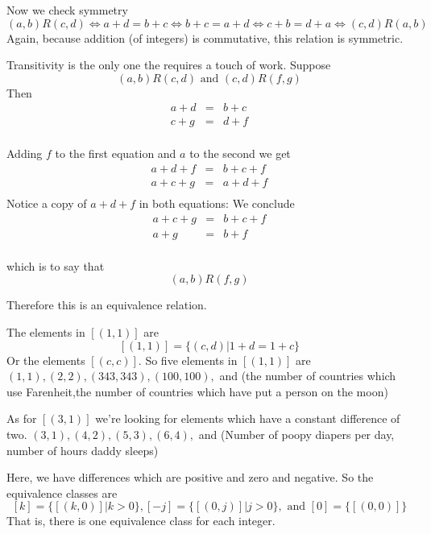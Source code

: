 \documentclass[16 pt]{amsart}
\theoremstyle{definition}
\theoremstyle{remark}
\numberwithin{equation}{subsection}
\begin{document}
Now we check symmetry
\[
(a,b)R(c,d) \iff a+d=b+c \iff b+c = a+d \iff c+b = d+a \iff (c,d)R(a,b)
\]
Again, because addition (of integers) is commutative, this relation is symmetric.

Transitivity is the only one the requires a touch of work.  Suppose
\[
(a,b)R(c,d) \text{ and } (c,d) R (f,g)
\]
Then
\begin{eqnarray*}
a+d & = & b+c \\
c+g & = & d+ f\\
\end{eqnarray*}

Adding $f$ to the first equation and $a$ to the second we get
\begin{eqnarray*}
a+d+f & = & b+c+f \\
a+c+g & = & a+d+ f\\
\end{eqnarray*}
Notice a copy of $a+d+f$ in both equations: We conclude
\begin{eqnarray*}
a+c+g & = & b+c + f \\
a+g & = & b + f\\
\end{eqnarray*}

which is to say that 
\[
(a,b)R(f,g)
\]

Therefore this is an equivalence relation.

\vspace{.5in}

The elements in $[(1,1)]$ are 
\[
[(1,1)] = \{ (c,d) | 1+d = 1+c\}
\]
Or the elements $[(c,c)]$.
So five elements in $[(1,1)]$ are $(1,1),(2,2),(343,343),(100,100),$ and
(the number of countries which use Farenheit,the number of countries which have put a person on the moon)

\vspace{.5in}
As for $[(3,1)]$ we're looking for elements which have a constant difference of two.
$(3,1),(4,2),(5,3),(6,4),$ and
(Number of poopy diapers per day, number of hours daddy sleeps)

\vspace{.5in}

Here, we have differences which are positive and zero and negative.  So the equivalence classes are
\[
[k] = \{[(k,0)] | k > 0\}, [-j] = \{[(0,j)] | j>0\}, \text{ and } [0] = \{[(0,0)] \}  
\]
That is, there is one equivalence class for each integer.
\end{document}
